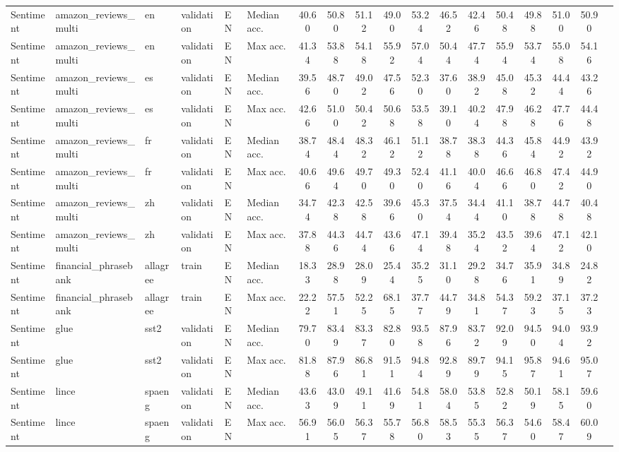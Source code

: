 \documentclass[11pt]{article}
\begin{document}
\begin{table*}[ht]
\begin{minipage}{\pdfpagewidth}
{\begin{tabular}{llllll|ccccc|ccccccc}
\midrule
Sentiment & amazon\_reviews\_multi & en & validation & EN & Median acc. & 40.60 & 50.80 & 51.12 & 49.00 & 53.24 & 46.52 & 42.46 & 50.48 & 49.88 & 51.00 & 50.90\\
Sentiment & amazon\_reviews\_multi & en & validation & EN & Max acc. & 41.34 & 53.88 & 54.18 & 55.92 & 57.04 & 50.44 & 47.74 & 55.94 & 53.74 & 55.08 & 54.16\\
Sentiment & amazon\_reviews\_multi & es & validation & EN & Median acc. & 39.56 & 48.70 & 49.02 & 47.56 & 52.30 & 37.60 & 38.92 & 45.08 & 45.32 & 44.44 & 43.26\\
Sentiment & amazon\_reviews\_multi & es & validation & EN & Max acc. & 42.66 & 51.00 & 50.42 & 50.68 & 53.58 & 39.10 & 40.24 & 47.98 & 46.28 & 47.76 & 44.48\\
Sentiment & amazon\_reviews\_multi & fr & validation & EN & Median acc. & 38.74 & 48.44 & 48.32 & 46.12 & 51.12 & 38.78 & 38.38 & 44.36 & 45.84 & 44.92 & 43.92\\
Sentiment & amazon\_reviews\_multi & fr & validation & EN & Max acc. & 40.66 & 49.64 & 49.70 & 49.30 & 52.40 & 41.16 & 40.04 & 46.66 & 46.80 & 47.42 & 44.90\\
Sentiment & amazon\_reviews\_multi & zh & validation & EN & Median acc. & 34.74 & 42.38 & 42.58 & 39.66 & 45.30 & 37.54 & 34.44 & 41.10 & 38.78 & 44.78 & 40.48\\
Sentiment & amazon\_reviews\_multi & zh & validation & EN & Max acc. & 37.88 & 44.36 & 44.74 & 43.66 & 47.14 & 39.48 & 35.24 & 43.52 & 39.64 & 47.12 & 42.10\\
Sentiment & financial\_phrasebank & allagree & train & EN & Median acc. & 18.33 & 28.98 & 28.09 & 25.44 & 35.25 & 31.10 & 29.28 & 34.76 & 35.91 & 34.89 & 24.82\\
Sentiment & financial\_phrasebank & allagree & train & EN & Max acc. & 22.22 & 57.51 & 52.25 & 68.15 & 37.77 & 44.79 & 34.81 & 54.37 & 59.23 & 37.15 & 37.23\\
Sentiment & glue & sst2 & validation & EN & Median acc. & 79.70 & 83.49 & 83.37 & 82.80 & 93.58 & 87.96 & 83.72 & 92.09 & 94.50 & 94.04 & 93.92\\
Sentiment & glue & sst2 & validation & EN & Max acc. & 81.88 & 87.96 & 86.81 & 91.51 & 94.84 & 92.89 & 89.79 & 94.15 & 95.87 & 94.61 & 95.07\\
Sentiment & lince & spaeng & validation & EN & Median acc. & 43.63 & 43.09 & 49.11 & 41.69 & 54.81 & 58.04 & 53.85 & 52.82 & 50.19 & 58.15 & 59.60\\
Sentiment & lince & spaeng & validation & EN & Max acc. & 56.91 & 56.05 & 56.37 & 55.78 & 56.80 & 58.53 & 55.35 & 56.37 & 54.60 & 58.47 & 60.09\\

\end{tabular}}
\end{minipage}
\end{table*}
\end{document}
